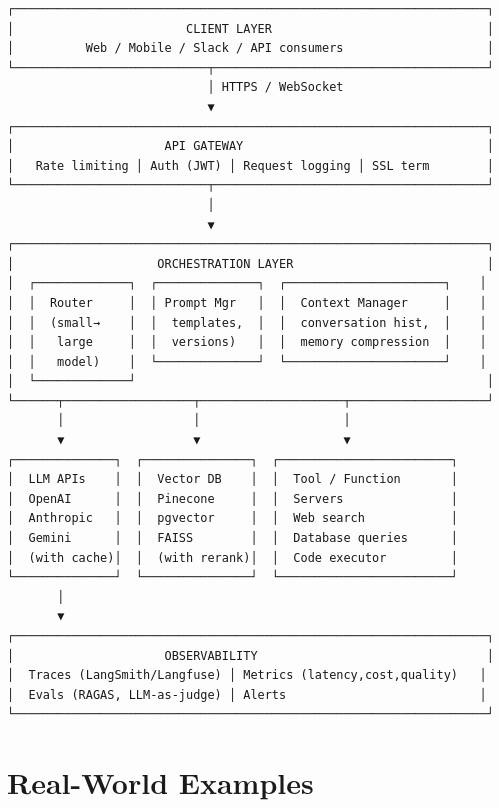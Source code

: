 \documentclass[11pt]{article}
\begin{document}
\begin{verbatim}
┌──────────────────────────────────────────────────────────────────┐
│                        CLIENT LAYER                              │
│          Web / Mobile / Slack / API consumers                    │
└───────────────────────────┬──────────────────────────────────────┘
                            │ HTTPS / WebSocket
                            ▼
┌──────────────────────────────────────────────────────────────────┐
│                     API GATEWAY                                  │
│   Rate limiting │ Auth (JWT) │ Request logging │ SSL term        │
└───────────────────────────┬──────────────────────────────────────┘
                            │
                            ▼
┌──────────────────────────────────────────────────────────────────┐
│                    ORCHESTRATION LAYER                           │
│  ┌─────────────┐  ┌──────────────┐  ┌──────────────────────┐    │
│  │  Router     │  │ Prompt Mgr   │  │  Context Manager     │    │
│  │  (small→    │  │  templates,  │  │  conversation hist,  │    │
│  │   large     │  │  versions)   │  │  memory compression  │    │
│  │   model)    │  └──────────────┘  └──────────────────────┘    │
│  └─────────────┘                                                 │
└──────┬──────────────────┬────────────────────┬───────────────────┘
       │                  │                    │
       ▼                  ▼                    ▼
┌──────────────┐  ┌───────────────┐  ┌────────────────────────┐
│  LLM APIs    │  │  Vector DB    │  │  Tool / Function       │
│  OpenAI      │  │  Pinecone     │  │  Servers               │
│  Anthropic   │  │  pgvector     │  │  Web search            │
│  Gemini      │  │  FAISS        │  │  Database queries      │
│  (with cache)│  │  (with rerank)│  │  Code executor         │
└──────────────┘  └───────────────┘  └────────────────────────┘
       │
       ▼
┌──────────────────────────────────────────────────────────────────┐
│                     OBSERVABILITY                                │
│  Traces (LangSmith/Langfuse) │ Metrics (latency,cost,quality)   │
│  Evals (RAGAS, LLM-as-judge) │ Alerts                           │
└──────────────────────────────────────────────────────────────────┘
\end{verbatim}

\section{Real-World Examples}\label{real-world-examples}
\end{document}
